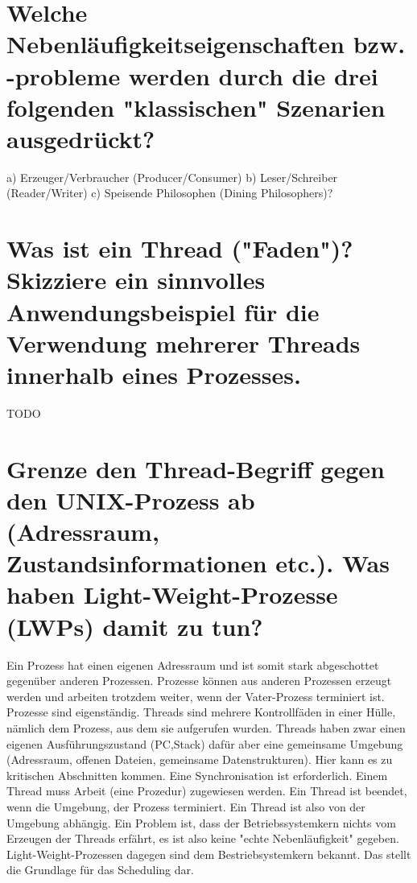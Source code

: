 \documentclass[12pt,a4paper,ngerman]{scrartcl}
\newcommand{\question}[1]{#1}
\newenvironment {answer}
                {}
                {}
\begin{document}
\section{\question{Welche Nebenläufigkeitseigenschaften bzw. -probleme werden durch die drei folgenden "klassischen" Szenarien ausgedrückt?}}
\begin{answer}
a) Erzeuger/Verbraucher (Producer/Consumer)
b) Leser/Schreiber (Reader/Writer)
c) Speisende Philosophen (Dining Philosophers)?
\end{answer}

\section{\question{Was ist ein Thread ("Faden")? Skizziere ein sinnvolles Anwendungsbeispiel für die Verwendung mehrerer Threads innerhalb eines Prozesses.}}
\begin{answer}
TODO 
\end{answer}

\section{\question{Grenze den Thread-Begriff gegen den UNIX-Prozess ab (Adressraum, Zustandsinformationen etc.). Was haben Light-Weight-Prozesse (LWPs) damit zu tun?}}
\begin{answer}
Ein Prozess hat einen eigenen Adressraum und ist somit stark abgeschottet gegenüber anderen
Prozessen. Prozesse können aus anderen Prozessen erzeugt werden und arbeiten trotzdem weiter,
wenn der Vater-Prozess terminiert ist. Prozesse sind eigenständig.
Threads sind mehrere Kontrollfäden in einer Hülle, nämlich dem Prozess, aus dem sie aufgerufen
wurden. Threads haben zwar einen eigenen Ausführungszustand (PC,Stack) dafür aber eine
gemeinsame Umgebung (Adressraum, offenen Dateien, gemeinsame Datenstrukturen). Hier kann
es zu kritischen Abschnitten kommen. Eine Synchronisation ist erforderlich. Einem Thread muss
Arbeit (eine Prozedur) zugewiesen werden. Ein Thread ist beendet, wenn die Umgebung, der Prozess
terminiert. Ein Thread ist also von der Umgebung abhängig.
Ein Problem ist, dass der Betriebssystemkern nichts vom Erzeugen der Threads erfährt, es ist also
keine "echte Nebenläufigkeit" gegeben.
Light-Weight-Prozessen dagegen sind dem Bestriebsystemkern bekannt. Das stellt die Grundlage
für das Scheduling dar.
\end{answer}
\end{document}
